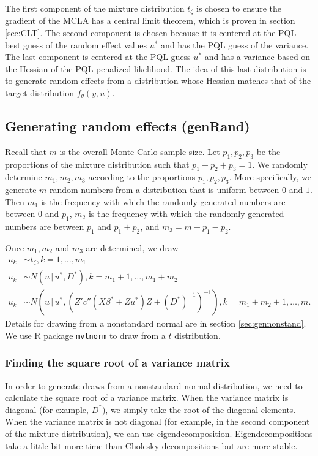 \documentclass{article}
\begin{document}
The first component of the mixture distribution $t_\zeta$ is chosen to ensure  the gradient of the MCLA has a central limit theorem, which is proven in  section \ref{sec:CLT}.  The second component is chosen because it is centered at the PQL best guess of the random effect values $u^*$ and  has the PQL guess of the variance. The last component is centered at the PQL guess $u^*$ and has a variance based on the Hessian of the PQL penalized likelihood.  The idea of this last distribution is to generate random effects from a distribution whose Hessian matches that of the target distribution $f_\theta(y,u)$.

\subsection{Generating random effects (genRand)}\label{sec:genRand}

 Recall that $m$ is the overall Monte Carlo sample size.  Let $p_1,p_2,p_3$ be the proportions of the mixture distribution such that  $p_1+p_2+p_3=1$. We randomly determine $m_1,m_2,m_3$ according to the proportions $p_1,p_2,p_3$. More specifically, we generate $m$ random numbers from a distribution that is uniform between $0$ and $1$. Then $m_1$ is the frequency with which the randomly generated numbers are between $0$ and $p_1$,  $m_2$ is the frequency with which the randomly generated numbers are between $p_1$ and $p_1+p_2$, and $m_3=m-p_1-p_2$.

Once $m_1, m_2$ and $m_3$ are determined, we draw 
\begin{align}
u_k &\sim t_\zeta ,k=1,\ldots,m_1\\
u_k &\sim N(u \, | \, u^*, D^*) ,k=m_1+1,\ldots,m_1+m_2\\
u_k &\sim N(u \, | \, u^*, (Z'  c''(X \beta^*+Zu^*) Z +(D^*)^{-1}   )^{-1}) ,k=m_1+m_2+1,\ldots,m.
\end{align}
Details for drawing from a nonstandard normal are in section \ref{sec:gennonstand}. We use R package \texttt{mvtnorm} to draw from a $t$ distribution.
 





\subsubsection{Finding the square root of a variance matrix}\label{sec:sqrtmat}
In order to generate draws from a nonstandard normal distribution, we need to calculate the square root of a variance matrix. When the variance matrix is diagonal (for example, $D^*$), we simply take the root of the diagonal elements.  When the variance matrix is not diagonal (for example, in the second component of the mixture distribution), we can use eigendecomposition. Eigendecompositions take a little bit more time than Cholesky decompositions but are more stable. 
\end{document}
